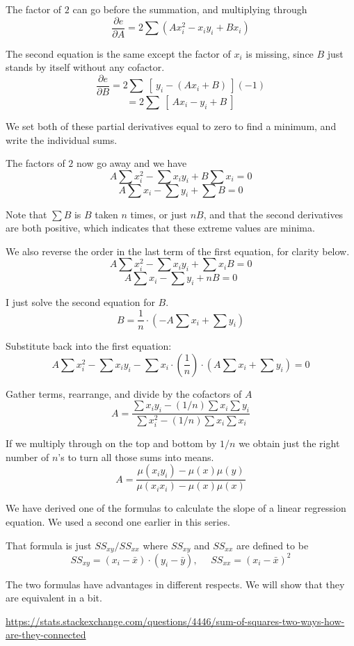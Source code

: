 \documentclass[11pt, oneside]{article}
\begin{document}
The factor of $2$ can go before the summation, and multiplying through
\[ \frac{\partial e}{\partial A} = 2 \sum (Ax_i^2 - x_i y_i + B x_i) \]

The second equation is the same except the factor of $x_i$ is missing, since $B$ just stands by itself without any cofactor.
\[ \frac{\partial e}{\partial B} = 2 \sum  \ [ \ y_i - (Ax_i + B) \ ] (-1) \]
\[ = 2 \sum  \ [ \ Ax_i - y_i + B \ ] \]

We set both of these partial derivatives equal to zero to find a minimum, and write the individual sums.  

The factors of $2$ now go away and we have
\[ A \sum x_i^2 -  \sum x_i y_i + B \sum x_i = 0 \]
\[ A \sum x_i -  \sum y_i + \sum B = 0 \]

Note that $\sum B$ is $B$ taken $n$ times, or just $nB$, and that the second derivatives are both positive, which indicates that these extreme values are minima.

We also reverse the order in the last term of the first equation, for clarity below.
\[ A \sum x_i^2 -  \sum x_i y_i + \sum x_i B = 0 \]
\[ A \sum x_i -  \sum y_i + nB = 0 \]

I just solve the second equation for $B$.
\[ B = \frac{1}{n} \cdot (- A \sum x_i +  \sum y_i) \]

Substitute back into the first equation:
\[ A \sum x_i^2 -  \sum x_i y_i - \sum x_i \cdot (\frac{1}{n}) \cdot ( A \sum x_i +  \sum y_i) = 0 \]

Gather terms, rearrange, and divide by the cofactors of $A$
\[ A = \frac{\sum x_i y_i - (1/n) \sum x_i \sum y_i}{\sum x_i^2 - (1/n) \sum x_i \sum x_i } \]

If we multiply through on the top and bottom by $1/n$ we obtain just the right number of $n$'s to turn all those sums into means.
\[ A = \frac{\mu(x_i y_i) - \mu(x) \mu(y)}{\mu(x_i x_i) - \mu(x)  \mu(x)} \]

We have derived one of the formulas to calculate the slope of a linear regression equation.  We used a second one earlier in this series.

That formula is just $SS_{xy}/SS_{xx}$ where $SS_{xy}$ and $SS_{xx}$ are defined to be
\[ SS_{xy} = (x_i - \bar{x}) \cdot (y_i - \bar{y}), \ \ \ \ \ \ SS_{xx} = (x_i - \bar{x})^2 \]

The two formulas have advantages in different respects.  We will show that they are equivalent in a bit.

\url{https://stats.stackexchange.com/questions/4446/sum-of-squares-two-ways-how-are-they-connected}
\end{document}
